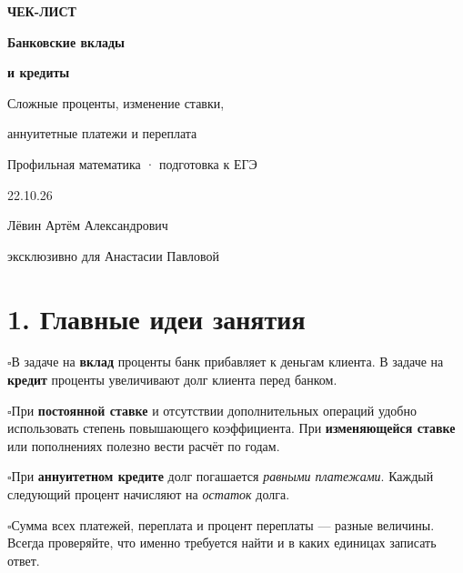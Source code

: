 \documentclass[a4paper,12pt]{article}
\newcommand{\checkitem}[1]{\noindent\(\square\)\enspace #1\par}
\newcommand{\keyterm}[1]{{\color{darkaccent}\textbf{#1}}}
\newcommand{\smallrule}{\par\smallskip\noindent{\color{lightline}\rule{\linewidth}{.4pt}}\par\smallskip}
\begin{document}
\setlength{\abovedisplayskip}{7pt}
\setlength{\belowdisplayskip}{7pt}
\setlength{\abovedisplayshortskip}{4pt}
\setlength{\belowdisplayshortskip}{5pt}

\begin{titlepage}
\thispagestyle{empty}
\begin{center}
\vspace*{37mm}
{\Large\color{accent}\bfseries ЧЕК-ЛИСТ\par}
\vspace{11mm}
{\Huge\color{darkaccent}\bfseries Банковские вклады\par}
\vspace{5mm}
{\LARGE\color{darkaccent}\bfseries и кредиты\par}
\vspace{12mm}
{\large Сложные проценты, изменение ставки,\par}
{\large аннуитетные платежи и переплата\par}
\vspace{23mm}
{\large Профильная математика · подготовка к ЕГЭ\par}
\vspace{9mm}
{\large 22.10.26\par}
\vfill
{\normalsize Лёвин Артём Александрович\par}
{\normalsize эксклюзивно для Анастасии Павловой\par}
\vspace{21mm}
\end{center}
\end{titlepage}
\setcounter{page}{2}

\section*{1. Главные идеи занятия}
\checkitem{В задаче на \keyterm{вклад} проценты банк прибавляет к деньгам клиента. В задаче на \keyterm{кредит} проценты увеличивают долг клиента перед банком.}
\checkitem{При \keyterm{постоянной ставке} и отсутствии дополнительных операций удобно использовать степень повышающего коэффициента. При \keyterm{изменяющейся ставке} или пополнениях полезно вести расчёт по годам.}
\checkitem{При \keyterm{аннуитетном кредите} долг погашается \emph{равными платежами}. Каждый следующий процент начисляют на \emph{остаток} долга.}
\checkitem{Сумма всех платежей, переплата и процент переплаты --- разные величины. Всегда проверяйте, что именно требуется найти и в каких единицах записать ответ.}
\smallrule
\end{document}
